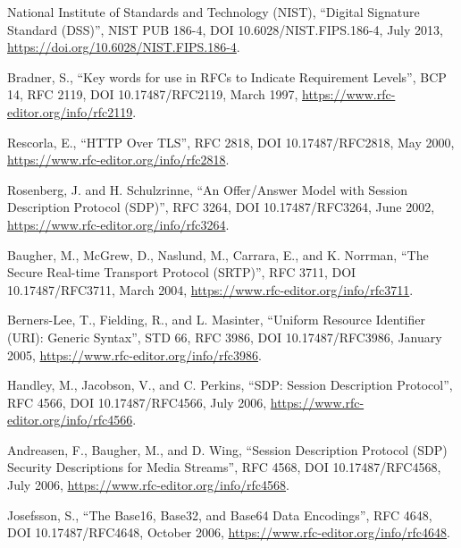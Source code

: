 \documentclass{article}
\begin{document}
\begin{description}[style=nextline, leftmargin=2cm, labelwidth=1.8cm]

\item[{[FIPS186]}] National Institute of Standards and Technology (NIST),
  ``Digital Signature Standard (DSS)'', NIST PUB 186-4,
  DOI 10.6028/NIST.FIPS.186-4, July 2013,
  \url{https://doi.org/10.6028/NIST.FIPS.186-4}.

\item[{[RFC2119]}] Bradner, S., ``Key words for use in RFCs to Indicate
  Requirement Levels'', BCP 14, RFC 2119,
  DOI 10.17487/RFC2119, March 1997,
  \url{https://www.rfc-editor.org/info/rfc2119}.

\item[{[RFC2818]}] Rescorla, E., ``HTTP Over TLS'', RFC 2818,
  DOI 10.17487/RFC2818, May 2000,
  \url{https://www.rfc-editor.org/info/rfc2818}.

\item[{[RFC3264]}] Rosenberg, J. and H. Schulzrinne, ``An Offer/Answer Model
  with Session Description Protocol (SDP)'', RFC 3264,
  DOI 10.17487/RFC3264, June 2002,
  \url{https://www.rfc-editor.org/info/rfc3264}.

\item[{[RFC3711]}] Baugher, M., McGrew, D., Naslund, M., Carrara, E., and K.
  Norrman, ``The Secure Real-time Transport Protocol (SRTP)'',
  RFC 3711, DOI 10.17487/RFC3711, March 2004,
  \url{https://www.rfc-editor.org/info/rfc3711}.

\item[{[RFC3986]}] Berners-Lee, T., Fielding, R., and L. Masinter, ``Uniform
  Resource Identifier (URI): Generic Syntax'', STD 66,
  RFC 3986, DOI 10.17487/RFC3986, January 2005,
  \url{https://www.rfc-editor.org/info/rfc3986}.

\item[{[RFC4566]}] Handley, M., Jacobson, V., and C. Perkins, ``SDP: Session
  Description Protocol'', RFC 4566, DOI 10.17487/RFC4566,
  July 2006, \url{https://www.rfc-editor.org/info/rfc4566}.

\item[{[RFC4568]}] Andreasen, F., Baugher, M., and D. Wing, ``Session
  Description Protocol (SDP) Security Descriptions for Media
  Streams'', RFC 4568, DOI 10.17487/RFC4568, July 2006,
  \url{https://www.rfc-editor.org/info/rfc4568}.

\item[{[RFC4648]}] Josefsson, S., ``The Base16, Base32, and Base64 Data
  Encodings'', RFC 4648, DOI 10.17487/RFC4648, October 2006,
  \url{https://www.rfc-editor.org/info/rfc4648}.


\end{description}
\end{document}
